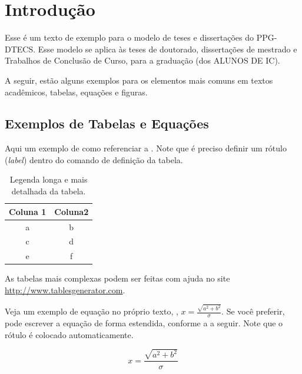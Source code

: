 \chapter{Introdução}\label{chp:Introducao}

Esse é um texto de exemplo para o modelo de teses e dissertações do PPG-DTECS. Esse modelo se aplica às teses de doutorado, dissertações de mestrado e Trabalhos de Conclusão de Curso, para a graduação (dos ALUNOS DE IC).

A seguir, estão alguns exemplos para os elementos mais comuns em textos acadêmicos, \ie tabelas, equações e figuras. 

\section{Exemplos de Tabelas e Equações}\label{sec:exemplostabelas}
Aqui um exemplo de como referenciar a . Note que é preciso definir um rótulo (\textit{label}) dentro do comando de definição da tabela.

\begin{table}[!htp]
\caption[Legenda curta da tabela]{Legenda longa e mais detalhada da tabela.}
\label{tab:tabela_1}
\begin{center}
\begin{tabular}{cc}
\toprule %
Coluna 1 & Coluna2 \\ \midrule %
a & b \\
c & d \\
e & f \\\bottomrule %
\end{tabular}
\end{center}
\end{table}

As tabelas mais complexas podem ser feitas com ajuda no site \href{http://www.tablesgenerator.com}{http://www.tables\-ge\-ne\-ra\-tor.com}.

Veja um exemplo de equação no próprio texto, \eg, $x=\frac{\sqrt{a^{2}+b^{2}}}{\sigma}$.  Se você preferir, pode escrever a equação de forma estendida, conforme a  a seguir. Note que o rótulo é colocado automaticamente.

\begin{equation}
x=\frac{\sqrt{a^{2}+b^{2}}}{\sigma}
\label{eq:teste}
\end{equation}


